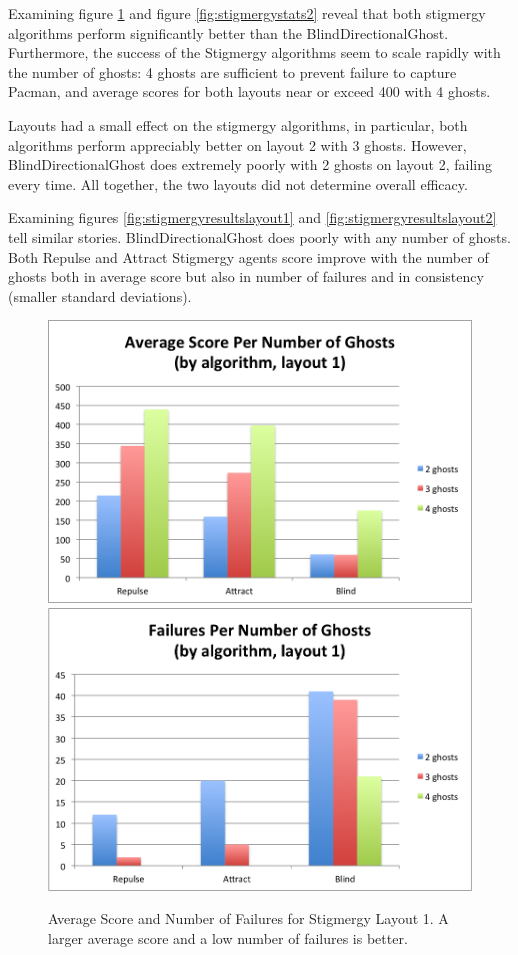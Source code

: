 \documentclass[11pt]{article}
\begin{document}
\begin{multicols}{2}
Examining figure \ref{fig:stigmergystats1} and figure \ref{fig:stigmergystats2} reveal that both stigmergy algorithms perform significantly better than the BlindDirectionalGhost.  Furthermore, the success of the Stigmergy algorithms seem to scale rapidly with the number of ghosts: 4 ghosts are sufficient to prevent failure to capture Pacman, and average scores for both layouts near or exceed 400 with 4 ghosts. 

Layouts had a small effect on the stigmergy algorithms, in particular, both algorithms perform appreciably better on layout 2 with 3 ghosts.  However, BlindDirectionalGhost does extremely poorly with 2 ghosts on layout 2, failing every time.  All together, the two layouts did not determine overall efficacy.

Examining figures \ref{fig:stigmergyresultslayout1} and \ref{fig:stigmergyresultslayout2} tell similar stories.  BlindDirectionalGhost does poorly with any number of ghosts.  Both Repulse and Attract Stigmergy agents score improve with the number of ghosts both in average score but also in number of failures and in consistency (smaller standard deviations).

\end{multicols}
\begin{figure}[H]
	\includegraphics[width=0.5 \columnwidth]{stigmergytrendclassicscore.png}
	\includegraphics[width= 0.5 \columnwidth]{stigmergytrendclassicfail.png}
	\caption{Average Score and Number of Failures for Stigmergy Layout 1.  A larger average score and a low number of failures is better.}
	\label{fig:stigmergystats1}
\end{figure}
\end{document}
